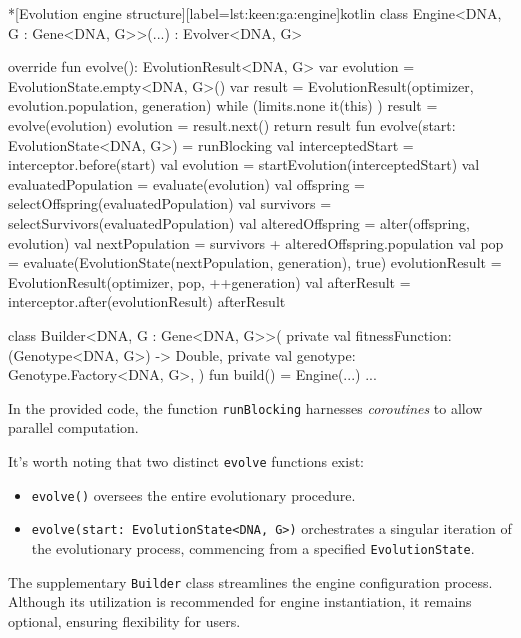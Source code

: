   \begin{code}*[Evolution engine structure][label={lst:keen:ga:engine}]{kotlin}
    class Engine<DNA, G : Gene<DNA, G>>(...) : Evolver<DNA, G> {
        override fun evolve(): EvolutionResult<DNA, G> {
            var evolution = EvolutionState.empty<DNA, G>()
            var result = EvolutionResult(optimizer, evolution.population, generation)
            while (limits.none { it(this) }) {
                result = evolve(evolution)
                evolution = result.next()
            }
            return result
        }
        fun evolve(start: EvolutionState<DNA, G>) = runBlocking {
            val interceptedStart = interceptor.before(start)
            val evolution = startEvolution(interceptedStart)
            val evaluatedPopulation = evaluate(evolution)
            val offspring = selectOffspring(evaluatedPopulation)
            val survivors = selectSurvivors(evaluatedPopulation)
            val alteredOffspring = alter(offspring, evolution)
            val nextPopulation = survivors + alteredOffspring.population
            val pop = evaluate(EvolutionState(nextPopulation, generation), true)
            evolutionResult = EvolutionResult(optimizer, pop, ++generation)
            val afterResult = interceptor.after(evolutionResult)
            afterResult
        }

        class Builder<DNA, G : Gene<DNA, G>>(
            private val fitnessFunction: (Genotype<DNA, G>) -> Double,
            private val genotype: Genotype.Factory<DNA, G>,
        ) {
            fun build() = Engine(...)
            ...
        }
    }
  \end{code}

  In the provided code, the function \texttt{runBlocking} harnesses 
  \textit{coroutines} to allow parallel computation.

  It's worth noting that two distinct \texttt{evolve} functions exist: 
  
  \begin{itemize}
    \item \texttt{evolve()} oversees the entire evolutionary procedure.
    \item \texttt{evolve(start: EvolutionState<DNA, G>)} orchestrates a singular
      iteration of the evolutionary process, commencing from a specified
      \texttt{EvolutionState}.
  \end{itemize}

  The supplementary \texttt{Builder} class streamlines the engine configuration 
  process.
  Although its utilization is recommended for engine instantiation, it remains 
  optional, ensuring flexibility for users.

